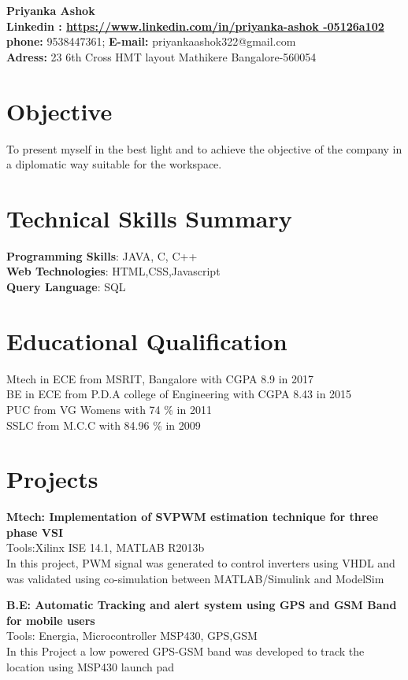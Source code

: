 \documentclass[margin,line]{res}
\begin{document}
{\LARGE  \bf  Priyanka Ashok} \\
{\bf Linkedin : \url{ https://www.linkedin.com/in/priyanka-ashok -05126a102}}\\{\bf phone:} 9538447361; {\bf E-mail:}  priyankaashok322@gmail.com\\{\bf Adress:} 23 6th Cross HMT layout Mathikere 
Bangalore-560054
\begin{resume}
	\section{\sc \bf Objective}
	To present myself in the best light and to achieve the objective of the company in a diplomatic way suitable for the workspace.
\section{\sc \bf Technical Skills Summary}
{\bf Programming Skills}: JAVA, C, C++ \\
{\bf Web Technologies}: HTML,CSS,Javascript\\
{\bf Query Language}: SQL
\section{\sc \bf Educational Qualification}
Mtech in ECE from MSRIT, Bangalore with CGPA 8.9 in 2017\\
BE in ECE from P.D.A college of Engineering with CGPA 8.43 in 2015\\
PUC from VG Womens with 74 \% in 2011\\
SSLC from M.C.C with 84.96 \% in 2009

\section{\sc \bf Projects}
{\bf Mtech: Implementation of SVPWM estimation technique for three phase VSI}\\
Tools:Xilinx ISE 14.1, MATLAB R2013b\\
In this project, PWM signal was generated to control inverters using VHDL and was validated using co-simulation between MATLAB/Simulink and ModelSim

{\bf B.E: Automatic Tracking and alert system using GPS and GSM Band for mobile users}\\
Tools: Energia, Microcontroller MSP430, GPS,GSM\\
In this Project a low powered GPS-GSM band was developed to track the location using MSP430 launch pad 


\end{resume}
\end{document}
